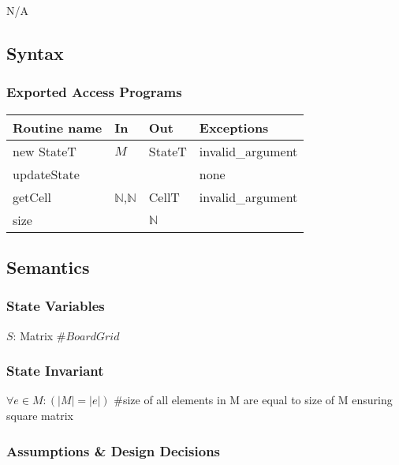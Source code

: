 \documentclass[12pt]{article}
\begin{document}
N/A

\subsection* {Syntax}


\subsubsection* {Exported Access Programs}

\begin{tabular}{| l | l | l | p{5cm} |}
\hline
\textbf{Routine name} & \textbf{In} & \textbf{Out} & \textbf{Exceptions}\\
\hline
new StateT & $M$ & StateT & invalid\_argument\\
\hline
updateState &  &  & none\\
\hline
getCell & $\mathbb{N}$,$\mathbb{N}$ & CellT & invalid\_argument\\
\hline
size & & $\mathbb{N}$ & \\
\hline
\end{tabular}

\subsection* {Semantics}

\subsubsection* {State Variables}

$S$: Matrix \#$Board Grid$

\subsubsection* {State Invariant}

$\forall e \in M : (|M| = |e|) $ \#size of all elements in M are equal to size of M ensuring square matrix

\subsubsection* {Assumptions \& Design Decisions}
\end{document}
